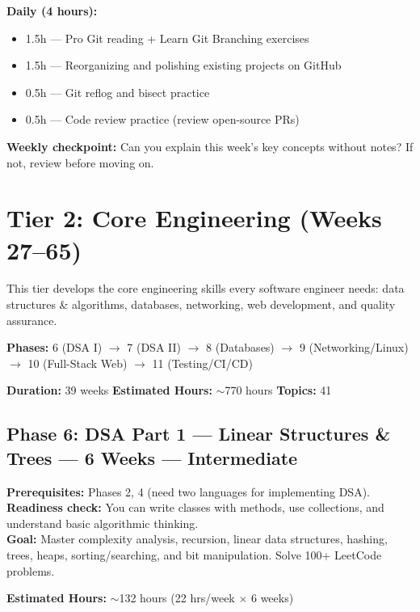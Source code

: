 \documentclass[11pt, a4paper, oneside]{report}
\begin{document}
\begin{practicebox}
\textbf{Daily (4 hours):}
\begin{itemize}[leftmargin=*]
\item 1.5h --- Pro Git reading + Learn Git Branching exercises
\item 1.5h --- Reorganizing and polishing existing projects on GitHub
\item 0.5h --- Git reflog and bisect practice
\item 0.5h --- Code review practice (review open-source PRs)
\end{itemize}


\textbf{Weekly checkpoint:} Can you explain this week's key concepts without notes? If not, review before moving on.
\end{practicebox}


\chapter[Tier 2: Core Engineering]{Tier 2: Core Engineering (Weeks 27--65)}

\begin{tieroverviewbox}[title={\textbf{Tier Overview}}]
This tier develops the core engineering skills every software engineer needs: data structures \& algorithms, databases, networking, web development, and quality assurance.

\textbf{Phases:} 6 (DSA I) $\to$ 7 (DSA II) $\to$ 8 (Databases) $\to$ 9 (Networking/Linux) $\to$ 10 (Full-Stack Web) $\to$ 11 (Testing/CI/CD)

\textbf{Duration:} 39 weeks \quad \textbf{Estimated Hours:} $\sim$770 hours \quad \textbf{Topics:} 41
\end{tieroverviewbox}
\clearpage
\section[Phase 6: DSA Part 1]{Phase 6: DSA Part 1 --- Linear Structures \& Trees --- 6 Weeks --- Intermediate}

\begin{prereqbox}
\textbf{Prerequisites:} Phases 2, 4 (need two languages for implementing DSA).\\
\textbf{Readiness check:} You can write classes with methods, use collections, and understand basic algorithmic thinking.\\
\textbf{Goal:} Master complexity analysis, recursion, linear data structures, hashing, trees, heaps, sorting/searching, and bit manipulation. Solve 100+ LeetCode problems.


\textbf{Estimated Hours:} $\sim$132 hours (22 hrs/week $\times$ 6 weeks)
\end{prereqbox}
\end{document}

